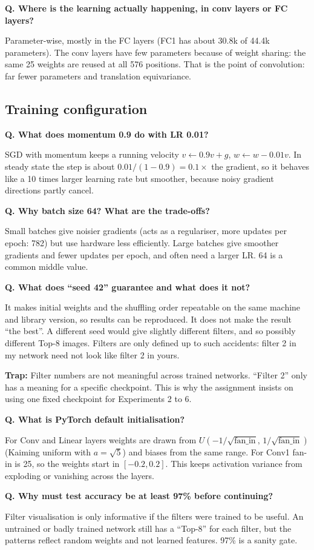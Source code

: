 \documentclass[11pt]{article}
\newcommand{\Q}[1]{\par\vspace{4pt}\noindent\textcolor{qcol}{\textbf{Q. #1}}\par\nopagebreak}
\newcommand{\A}[1]{\noindent #1\par}
\newcommand{\trap}[1]{\par\noindent\textcolor{warn}{\textbf{Trap:} #1}\par}
\begin{document}
\Q{Where is the learning actually happening, in conv layers or FC layers?}
\A{Parameter-wise, mostly in the FC layers (FC1 has about 30.8k of 44.4k parameters). The conv layers have few parameters because of weight sharing: the same 25 weights are reused at all 576 positions. That is the point of convolution: far fewer parameters and translation equivariance.}

\subsection{Training configuration}

\Q{What does momentum 0.9 do with LR 0.01?}
\A{SGD with momentum keeps a running velocity $v\leftarrow 0.9v+g$, $w\leftarrow w-0.01v$. In steady state the step is about $0.01/(1-0.9)=0.1\times$ the gradient, so it behaves like a 10 times larger learning rate but smoother, because noisy gradient directions partly cancel.}

\Q{Why batch size 64? What are the trade-offs?}
\A{Small batches give noisier gradients (acts as a regulariser, more updates per epoch: 782) but use hardware less efficiently. Large batches give smoother gradients and fewer updates per epoch, and often need a larger LR. 64 is a common middle value.}

\Q{What does ``seed 42'' guarantee and what does it not?}
\A{It makes initial weights and the shuffling order repeatable on the same machine and library version, so results can be reproduced. It does not make the result ``the best''. A different seed would give slightly different filters, and so possibly different Top-8 images. Filters are only defined up to such accidents: filter 2 in my network need not look like filter 2 in yours.}
\trap{Filter numbers are not meaningful across trained networks. ``Filter 2'' only has a meaning for a specific checkpoint. This is why the assignment insists on using one fixed checkpoint for Experiments 2 to 6.}

\Q{What is PyTorch default initialisation?}
\A{For Conv and Linear layers weights are drawn from $U(-1/\sqrt{\text{fan\_in}},\,1/\sqrt{\text{fan\_in}})$ (Kaiming uniform with $a=\sqrt5$) and biases from the same range. For Conv1 fan-in is 25, so the weights start in $[-0.2,0.2]$. This keeps activation variance from exploding or vanishing across the layers.}

\Q{Why must test accuracy be at least 97\% before continuing?}
\A{Filter visualisation is only informative if the filters were trained to be useful. An untrained or badly trained network still has a ``Top-8'' for each filter, but the patterns reflect random weights and not learned features. 97\% is a sanity gate.}
\end{document}

